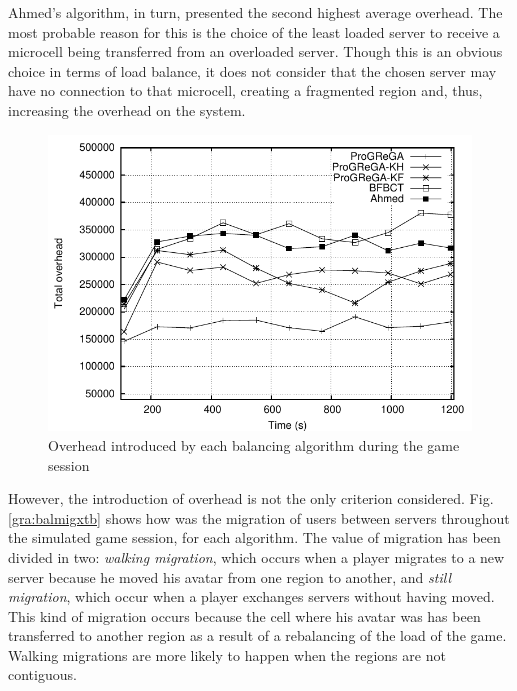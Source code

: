 Ahmed's algorithm, in turn, presented the second highest average overhead. The most probable reason for this is the choice of the least loaded server to receive a microcell being transferred from an overloaded server. Though this is an obvious choice in terms of load balance, it does not consider that the chosen server may have no connection to that microcell, creating a fragmented region and, thus, increasing the overhead on the system.

\begin{figure}[!t]
  \centering
  \includegraphics[width=0.9\linewidth]{images/baloverhead_ah}
  \caption{Overhead introduced by each balancing algorithm during the game session}
  \label{gra:baloverhead}
\end{figure}

However, the introduction of overhead is not the only criterion considered. Fig. \ref{gra:balmigxtb} shows how was the migration of users between servers throughout the simulated game session, for each algorithm. The value of migration has been divided in two: \emph{walking migration}, which occurs when a player migrates to a new server because he moved his avatar from one region to another, and \emph{still migration}, which occur when a player exchanges servers without having moved. This kind of migration occurs because the cell where his avatar was has been transferred to another region as a result of a rebalancing of the load of the game. Walking migrations are more likely to happen when the regions are not contiguous.

